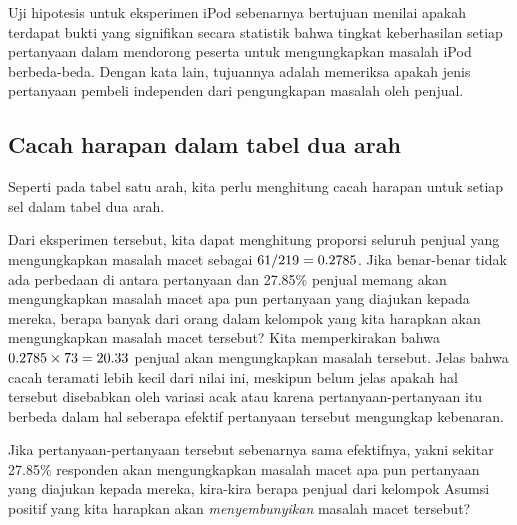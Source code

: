 Uji hipotesis untuk eksperimen iPod sebenarnya bertujuan
menilai apakah terdapat bukti yang signifikan secara statistik
bahwa tingkat keberhasilan setiap pertanyaan dalam mendorong peserta
untuk mengungkapkan masalah iPod berbeda-beda.
Dengan kata lain, tujuannya adalah memeriksa apakah jenis
pertanyaan pembeli independen dari pengungkapan
masalah oleh penjual.


\D{\newpage}

\subsection{Cacah harapan dalam tabel dua arah}

\noindent%
Seperti pada tabel satu arah, kita perlu menghitung
cacah harapan untuk setiap sel dalam tabel dua arah.

\begin{examplewrap}
\begin{nexample}{Dari eksperimen tersebut,
    kita dapat menghitung proporsi seluruh penjual yang mengungkapkan
    masalah macet sebagai $61{}/219 = 0.2785{}$.
    Jika benar-benar tidak ada perbedaan di antara pertanyaan
    dan 27.85\% penjual memang akan mengungkapkan masalah
    macet apa pun pertanyaan yang diajukan kepada mereka,
    berapa banyak dari \iPodDA{} orang dalam kelompok 
    yang kita harapkan akan mengungkapkan masalah
    macet tersebut?} \label{iPodExComputeExpAA}
  Kita memperkirakan bahwa $0.2785{} \times 73{} = 20.33{}$
  penjual akan mengungkapkan masalah tersebut.
  Jelas bahwa cacah teramati lebih kecil dari nilai ini, meskipun belum
  jelas apakah hal tersebut disebabkan oleh variasi acak atau karena
  pertanyaan-pertanyaan itu berbeda dalam hal seberapa efektif
  pertanyaan tersebut mengungkap kebenaran.
\end{nexample}
\end{examplewrap}

\begin{exercisewrap}
\begin{nexercise}\label{iPodExComputeExpBB}
Jika pertanyaan-pertanyaan tersebut sebenarnya sama efektifnya,
yakni sekitar 27.85\% responden akan mengungkapkan
masalah macet apa pun pertanyaan yang diajukan kepada mereka,
kira-kira berapa penjual dari kelompok Asumsi positif
yang kita harapkan akan \emph{menyembunyikan} masalah
macet tersebut?\footnotemark
\end{nexercise}
\end{exercisewrap}

